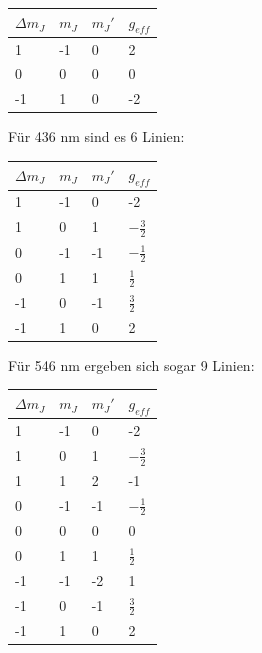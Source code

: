 \documentclass[bigchapter,colorback,accentcolor=tud4b,linedtoc,11pt]{tudreport}
\begin{document}
\begin{center}
  \begin{tabular}{|p{2cm}|p{2cm}|p{2cm}|p{2cm}|}
    \hline
    $\Delta m_J$ & $m_J$ & $m_J'$ & $g_{eff}$ \\ \hline
    1            & -1    & 0      & 2         \\ \hline
    0            & 0     & 0      & 0         \\ \hline
    -1           & 1     & 0      & -2        \\ \hline
	\end{tabular}
\end{center}

Für 436 nm sind es 6 Linien:

\begin{center}
  \begin{tabular}{|p{2cm}|p{2cm}|p{2cm}|p{2cm}|}
    \hline
    $\Delta m_J$ & $m_J$ & $m_J'$ & $g_{eff}$      \\ \hline
    1            & -1    & 0      & -2             \\ \hline
    1            & 0     & 1      & $-\frac{3}{2}$ \\ \hline
    0            & -1    & -1     & $-\frac{1}{2}$ \\ \hline
    0            & 1     & 1      & $\frac{1}{2}$  \\ \hline
   -1            & 0     & -1     & $\frac{3}{2}$  \\ \hline    
   -1            & 1     & 0      & 2              \\ \hline
    \end{tabular}
\end{center}

Für 546 nm ergeben sich sogar 9 Linien:

\begin{center}
  \begin{tabular}{|p{2cm}|p{2cm}|p{2cm}|p{2cm}|}
    \hline
    $\Delta m_J$ & $m_J$ & $m_J'$ & $g_{eff}$      \\ \hline
    1            & -1    & 0      & -2             \\ \hline
    1            & 0     & 1      & $-\frac{3}{2}$ \\ \hline
    1            & 1     & 2      & -1             \\ \hline
    0            & -1    & -1     & $-\frac{1}{2}$ \\ \hline
    0            & 0     & 0      & 0              \\ \hline
    0            & 1     & 1      & $\frac{1}{2}$  \\ \hline
    -1           & -1    & -2     & 1              \\ \hline
    -1           & 0     & -1     & $\frac{3}{2}$  \\ \hline
    -1           & 1     & 0      & 2              \\ \hline
    \end{tabular}
\end{center}
\end{document}
